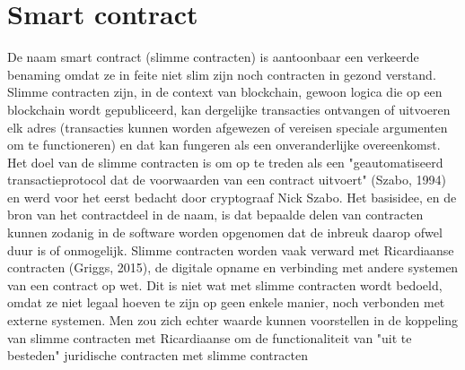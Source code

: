 \section{Smart contract}
De naam smart contract (slimme contracten) is aantoonbaar een verkeerde benaming omdat ze in feite niet slim zijn noch contracten in gezond verstand. Slimme contracten zijn, in de context van blockchain, gewoon logica die op een blockchain wordt gepubliceerd, kan dergelijke transacties ontvangen of uitvoeren elk adres (transacties kunnen worden afgewezen of vereisen speciale argumenten om te functioneren) en dat kan fungeren als een onveranderlijke overeenkomst. Het doel van de slimme contracten is om op te treden als een "geautomatiseerd transactieprotocol dat de voorwaarden van een contract uitvoert" (Szabo, 1994) en werd voor het eerst bedacht door cryptograaf Nick Szabo. Het basisidee, en de bron van het contractdeel in de naam, is dat bepaalde delen van contracten kunnen zodanig in de software worden opgenomen dat de inbreuk daarop ofwel duur is of onmogelijk. Slimme contracten worden vaak verward met Ricardiaanse contracten (Griggs, 2015), de digitale opname en verbinding met andere systemen van een contract op wet. Dit is niet wat met slimme contracten wordt bedoeld, omdat ze niet legaal hoeven te zijn op geen enkele manier, noch verbonden met externe systemen. Men zou zich echter waarde kunnen voorstellen in de koppeling van slimme contracten met Ricardiaanse om de functionaliteit van "uit te besteden" juridische contracten met slimme contracten
%
